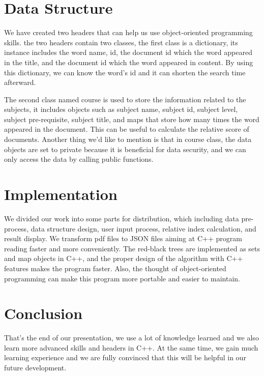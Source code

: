 \documentclass{article}
\begin{document}
\section{Data Structure}
We have created two headers that can help us use object-oriented programming skills. the two headers contain two classes, the first class is a dictionary, its instance includes the word name, id, the document id which the word appeared in the title, and the document id which the word appeared in content. By using this dictionary, we can know the word's id and it can shorten the search time afterward. 

The second class named course is used to store the information related to the subjects, it includes objects such as subject name, subject id, subject level, subject pre-requisite, subject title, and maps that store how many times the word appeared in the document. This can be useful to calculate the relative score of documents. Another thing we'd like to mention is that in course class, the data objects are set to private because it is beneficial for data security, and we can only access the data by calling public functions.

\section{Implementation}
We divided our work into some parts for distribution, which including data pre-process, data structure design, user input process, relative index calculation, and result display. We transform pdf files to JSON files aiming at C++ program reading faster and more conveniently. The red-black trees are implemented as sets and map objects in C++, and the proper design of the algorithm with C++ features makes the program faster. Also, the thought of object-oriented programming can make this program more portable and easier to maintain.

\section{Conclusion}
That's the end of our presentation, we use a lot of knowledge learned and we also learn more advanced skills and headers in C++. At the same time, we gain much learning experience and we are fully convinced that this will be helpful in our future development.
\end{document}
